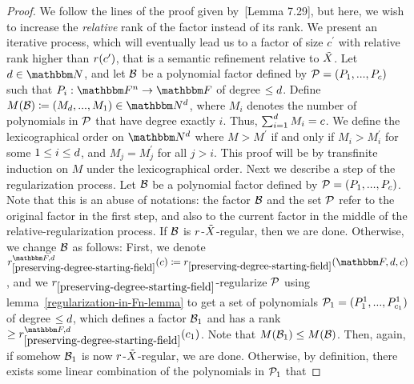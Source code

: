 \begin{proof}
    We follow the lines of the proof given by~\cite{book}[Lemma 7.29], but here, we wish to increase the \emph{relative} rank of the factor instead of its rank.
    We present an iterative process, which will eventually lead us to a factor of size $c^{\prime}$ with relative rank higher than ${{{r}}}(c^\prime)$,
    that is a semantic refinement relative to ${\tilde{X}}$.
    Let $\degree \in \naturalnumbersset$,
    and let $\mathcal{B}$ be a polynomial factor defined by $\genpolyset = (\genpoly_1,...,\genpoly_c)$ such that $\funcdef{\genpoly_i}{\field}{\basefield}$ of degree $\leq d$.
    Define $M(\factor) \definedas (M_{\degree},...,M_1) \in \naturalnumbersset^{\degree}$,
    where $M_i$ denotes the number of polynomials in $\genpolyset$ that have degree exactly $i$.
    Thus, $\sum_{i=1}^{d}M_i = c$.
    We define the lexicographical order on $\naturalnumbersset^{\degree}$ where $M > M^{\prime}$ if and only if $M_i > M^{\prime}_i$ for some $1 \leq i \leq d$,
    and $M_j = M^{\prime}_j$ for all $j > i$.
    This proof will be by transfinite induction on $M$ under the lexicographical order.
    Next we describe a step of the regularization process.
    \newline
    Let $\mathcal{B}$ be a polynomial factor defined by $\genpolyset = (\genpoly_1,...,\genpoly_c)$.
    Note that this is an abuse of notations: the factor $\mathcal{B}$ and the set $\genpolyset$ refer to the original factor in the first step, and also to the current factor in the middle of the relative-regularization process.
    If $\mathcal{B}$ is ${{{r}}}$-${\tilde{X}}$-regular, then we are done.
    Otherwise, we change $\mathcal{B}$ as follows:
    First, we denote $\rankfunc_{\ref{preserving-degree-starting-field}}^{\basefield, \degree}(c) \definedas \rankfunc_{\ref{preserving-degree-starting-field}}(\basefield, \degree, c)$,
    and we ${{{r}}}_{\ref{preserving-degree-starting-field}}$-regularize $\genpolyset$ using lemma~\ref{regularization-in-Fn-lemma}
    to get a set of polynomials $\genpolyset_1 = (\genpoly^1_1,...,\genpoly^1_{c_1})$ of degree $\leq d$,
    which defines a factor $\mathcal{B}_1$ and has a rank $\geq \rankfunc_{\ref{preserving-degree-starting-field}}^{\basefield, \degree}(c_1)$.
    Note that $M(\mathcal{B}_1) \leq M(\mathcal{B})$.
    Then, again, if somehow $\mathcal{B}_1$ is now ${{{r}}}$-${\tilde{X}}$-regular, we are done.
    \newline
    Otherwise, by definition, there exists some linear combination of the polynomials in $\genpolyset_{1}$ that

\end{proof}
